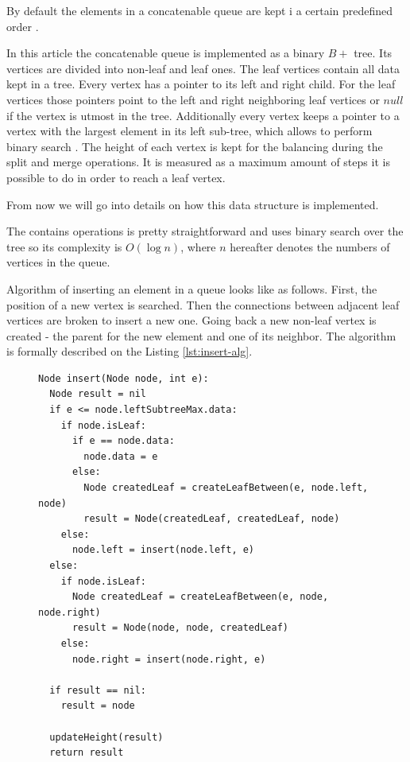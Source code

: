 \documentclass[conference]{IEEEtran}
\theoremstyle{plane}
\begin{document}
		By default the elements in a concatenable queue are kept i a certain predefined order \cite[pp..~155-157]{aho}.
		
		In this article the concatenable queue is implemented as a binary  $B+$ tree. Its vertices are divided into non-leaf and leaf ones. The leaf vertices contain all data kept in a tree. Every vertex has a pointer to its left and right child. For the leaf vertices those pointers point to the left and right neighboring leaf vertices or $null$ if the vertex is utmost in the tree. 
		Additionally every vertex keeps a pointer to a vertex with the largest element in its left sub-tree, which  allows to perform binary search \cite[pp..~155-157]{aho}. The height of each vertex is kept for the balancing during the split and merge operations. It is measured as a maximum amount of steps it is possible to do in order to reach a leaf vertex.
		
		From now we will go into details on how this data structure is implemented. 
		
		The contains operations is pretty straightforward and uses binary search over the tree so its complexity is $O(\log n)$, where $n$ hereafter denotes the numbers of vertices in the queue.
		
		Algorithm of inserting an element in a queue looks like as follows. First, the position of a new vertex is searched. Then the connections between adjacent leaf vertices are broken to insert a new one. Going back a new non-leaf vertex is created - the parent for the new element and one of its neighbor. The algorithm is formally described on the Listing \ref{lst:insert-alg}.
		
		\begin{figure}[htbp]
			\begin{lstlisting}[caption={Queue insertion algorithm},label={lst:insert-alg},captionpos=b]
Node insert(Node node, int e):
  Node result = nil
  if e <= node.leftSubtreeMax.data: 
  	if node.isLeaf:
  	  if e == node.data:
        node.data = e
  	  else:
        Node createdLeaf = createLeafBetween(e, node.left, node)
        result = Node(createdLeaf, createdLeaf, node)
    else:
      node.left = insert(node.left, e)
  else:
    if node.isLeaf: 
      Node createdLeaf = createLeafBetween(e, node, node.right)
      result = Node(node, node, createdLeaf)
    else: 
      node.right = insert(node.right, e)
  
  if result == nil:
  	result = node
  	
  updateHeight(result)
  return result
			\end{lstlisting}
		\end{figure}
		
\end{document}
